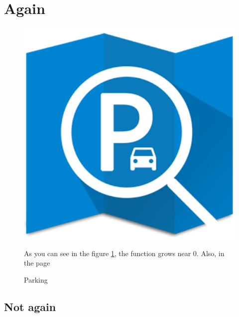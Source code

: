 \documentclass[12pt]{article}
\begin{document}
\section{\fontsize{14}{14}\selectfont Again}
\begin{figure}[h]
    \centering
    \includegraphics[width=1\textwidth]{a.png}
    \caption{Parking}
    \label{fig:mesh1}
    As you can see in the figure \ref{fig:mesh1}, the 
function grows near 0. Also, in the page \pageref{fig:mesh1} 
\end{figure}
\Blindtext
\subsection{ Not again}
\Blindtext
\end{document}
